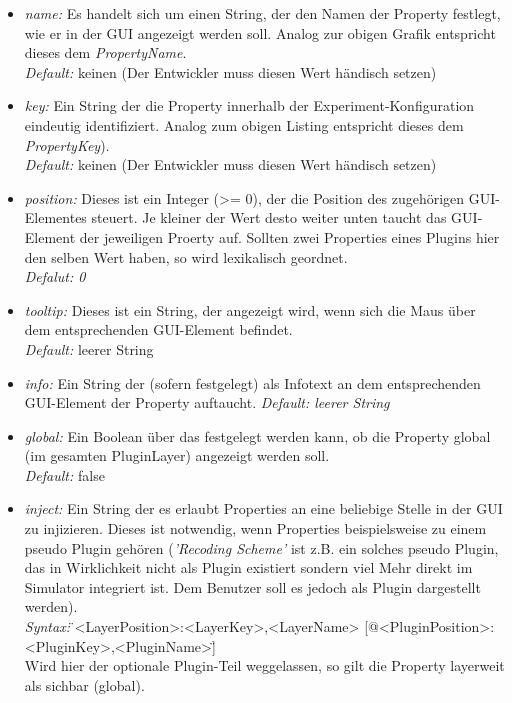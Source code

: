 \documentclass[a4paper, 11pt]{article} %
\begin{document}
\begin{itemize}
	\item \emph{name:} Es handelt sich um einen String, der den Namen der Property festlegt, wie er in der GUI angezeigt werden soll. Analog zur obigen Grafik entspricht dieses dem \emph{PropertyName}.\\
	\emph{Default:} keinen (Der Entwickler muss diesen Wert händisch setzen)
	\item \emph{key:} Ein String der die Property innerhalb der Experiment-Konfiguration eindeutig identifiziert. Analog zum obigen Listing entspricht dieses dem \emph{PropertyKey}).\\
	\emph{Default:} keinen (Der Entwickler muss diesen Wert händisch setzen)
	\item \emph{position:} Dieses ist ein Integer (>= 0), der die Position des zugehörigen GUI-Elementes steuert. Je kleiner der Wert desto weiter unten taucht das GUI-Element der jeweiligen Proerty auf. Sollten zwei Properties eines Plugins hier den selben Wert haben, so wird lexikalisch geordnet.\\
	\emph{Defalut: 0}\\
	\item \emph{tooltip:} Dieses ist ein String, der angezeigt wird, wenn sich die Maus über dem entsprechenden GUI-Element befindet.\\
	\emph{Default:} leerer String 
	\item \emph{info:} Ein String der (sofern festgelegt) als Infotext an dem entsprechenden GUI-Element der Property auftaucht.  
	\emph{Default: leerer String}
	\item \emph{global:} Ein Boolean über das festgelegt werden kann, ob die Property global (im gesamten PluginLayer) angezeigt werden soll.\\
	\emph{Default:} false
	\item \emph{inject:} Ein String der es erlaubt Properties an eine beliebige Stelle in der GUI zu injizieren. Dieses ist notwendig, wenn Properties beispielsweise zu einem pseudo Plugin gehören (\emph{'Recoding Scheme'} ist z.B. ein solches pseudo Plugin, das in Wirklichkeit nicht als Plugin existiert sondern viel Mehr direkt im Simulator integriert ist. Dem Benutzer soll es jedoch als Plugin dargestellt werden). \\
	\emph{Syntax:} \"{}<LayerPosition>:<LayerKey>,<LayerName> [@<PluginPosition>:<PluginKey>,<PluginName>]\"{}\\
	Wird hier der optionale Plugin-Teil weggelassen, so gilt die Property layerweit als sichbar (global).\\

\end{itemize}
\end{document}

